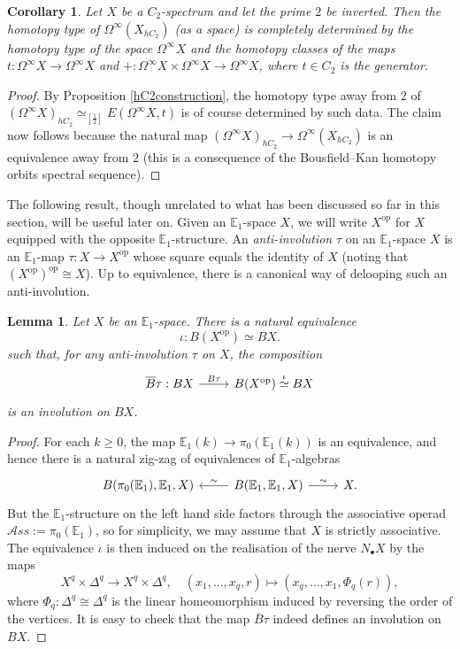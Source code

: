 \documentclass[a4paper, oneside]{amsart}
\newcommand{\1}{\mathds{1}}
\newtheorem{cor}[thm]{Corollary}
\newtheorem{lem}[thm]{Lemma}
\theoremstyle{remark}
\theoremstyle{definition}
\numberwithin{equation}{section}
\begin{document}
\begin{cor}\label{corinvolutionsuptohomotopy}
    Let $X$ be a $C_2$-spectrum and let the prime $2$ be inverted. Then the homotopy type of $\Omega^\infty(X_{hC_2})$ (as a space) is completely determined by the homotopy type of the space $\Omega^\infty X$ and the homotopy classes of the maps $t:\Omega^\infty X\to\Omega^\infty X$ and $+: \Omega^\infty X\times \Omega^\infty X\to \Omega^\infty X$, where $t\in C_2$ is the generator.
\end{cor}

\begin{proof}
    By Proposition \ref{hC2construction}, the homotopy type away from $2$ of $(\Omega^\infty X)_{hC_2}\simeq_{[\frac12]} E(\Omega^\infty X,t)$ is of course determined by such data. The claim now follows because the natural map $(\Omega^\infty X)_{hC_2}\to \Omega^\infty(X_{hC_2})$ is an equivalence away from $2$ (this is a consequence of the Bousfield--Kan homotopy orbits spectral sequence).
\end{proof}


The following result, though unrelated to what has been discussed so far in this section, will be useful later on. Given an $\mathbb{E}_1$-space $X$, we will write $X^{\mathrm{op}}$ for $X$ equipped with the opposite $\mathbb{E}_1$-structure. An \textit{anti-involution} $\tau$ on an $\mathbb{E}_1$-space $X$ is an $\mathbb{E}_1$-map $\tau: X\to X^{\mathrm{op}}$ whose square equals the identity of $X$ (noting that $(X^{\mathrm{op}})^{\mathrm{op}}\cong X$). Up to equivalence, there is a canonical way of delooping such an anti-involution.

\begin{lem}\label{antiinvolutionlem}
Let $X$ be an $\mathbb{E}_1$-space. There is a natural equivalence
$$
\iota: B(X^{\mathrm{op}})\simeq BX. 
$$
such that, for any anti-involution $\tau$ on $X$, the composition
$$
\begin{tikzcd}
\overline{B}\tau: BX\rar["B\tau"] &B(X^{\mathrm{op}})\overset{\iota}\simeq BX
\end{tikzcd}
$$
is an involution on $BX$.
\end{lem}
\begin{proof}
For each $k\geq 0$, the map $\mathbb{E}_1(k)\to \pi_0(\mathbb{E}_1(k))$ is an equivalence, and hence there is a natural zig-zag of equivalences of $\mathbb{E}_1$-algebras
$$
\begin{tikzcd}
B(\pi_0(\mathbb{E}_1),\mathbb{E}_1,X)&\lar["\sim"']B(\mathbb{E}_1,\mathbb{E}_1,X)\rar["\sim"] & X.
\end{tikzcd}
$$
But the $\mathbb{E}_1$-structure on the left hand side factors through the associative operad $\mathcal{A}ss:=\pi_0(\mathbb{E}_1)$, so for simplicity, we may assume that $X$ is strictly associative. The equivalence $\iota$ is then induced on the realisation of the nerve $N_\bullet X$ by the maps
    $$
X^{q}\times \Delta^q\longrightarrow X^{q}\times \Delta^q, \quad (x_1,\dots, x_q,r)\longmapsto (x_q,\dots, x_1, \Phi_q(r)),
    $$
    where $\Phi_q: \Delta^q\cong \Delta^q$ is the linear homeomorphism induced by reversing the order of the vertices. It is easy to check that the map $\overline{B}\tau$ indeed defines an involution on $BX$.\end{proof}
\end{document}
